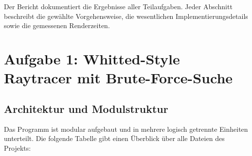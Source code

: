 \documentclass[11pt, a4paper]{article}
\begin{document}
Der Bericht dokumentiert die Ergebnisse aller Teilaufgaben. Jeder Abschnitt beschreibt die gewählte Vorgehensweise, die wesentlichen Implementierungsdetails sowie die gemessenen Renderzeiten.

\section{Aufgabe 1: Whitted-Style Raytracer mit Brute-Force-Suche}

\subsection{Architektur und Modulstruktur}

Das Programm ist modular aufgebaut und in mehrere logisch getrennte Einheiten unterteilt. Die folgende Tabelle gibt einen Überblick über alle Dateien des Projekts:
\end{document}
